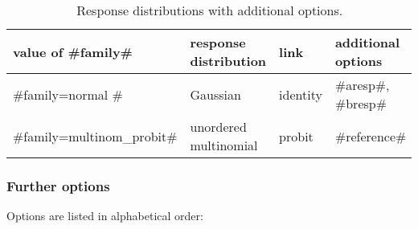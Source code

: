 \begin{table}[ht]
\begin{center}
\begin{tabular} {|l|l|l|l|}
\hline
value of #family# & response distribution & link & additional options \\
\hline
#family=normal #           & Gaussian              & identity &  #aresp#, #bresp# \\
\hline
#family=multinom_probit#   & unordered multinomial & probit & #reference#\\
\hline
\end{tabular}
{\em\caption {\label{mcmcregfamilyadditionalopt} Response distributions with additional options.}}
\end{center}
\end{table}

\subsubsection*{Further options} \label{further options}

Options are listed in alphabetical order:

